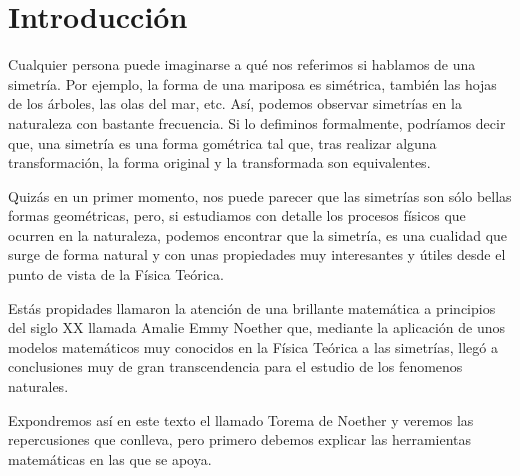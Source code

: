 \section{Introducción}\label{sec:introduccion}

Cualquier persona puede imaginarse a qué nos referimos si hablamos de una simetría. Por ejemplo, la forma de una mariposa es simétrica, también las hojas de los árboles, las olas del mar, etc. Así, podemos observar simetrías en la naturaleza con bastante frecuencia.
Si lo defiminos formalmente, podríamos decir que, una simetría es una forma gométrica tal que, tras realizar alguna transformación, la forma original y la transformada son equivalentes.

Quizás en un primer momento, nos puede parecer que las simetrías son sólo bellas formas geométricas, pero, si estudiamos con detalle los procesos físicos que ocurren en la naturaleza, podemos encontrar que la simetría, es una cualidad que surge de forma natural y con unas propiedades muy interesantes y útiles desde el punto de vista de la Física Teórica.

Estás propidades llamaron la atención de una brillante matemática a principios del siglo XX llamada Amalie Emmy Noether que, mediante la aplicación de unos modelos matemáticos muy conocidos en la Física Teórica a las simetrías, llegó a conclusiones muy de gran transcendencia para el estudio de los fenomenos naturales.

Expondremos así en este texto el llamado Torema de Noether y veremos las repercusiones que conlleva, pero primero debemos explicar las herramientas matemáticas en las que se apoya. 





